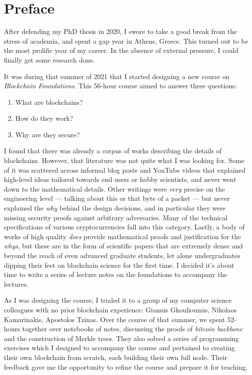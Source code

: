 \chapter*{Preface}

After defending my PhD thesis in 2020, I swore to take a good break
from the stress of academia, and spent a gap year in Athens, Greece.
This turned out to be the most prolific year of my career. In the absence
of external pressure, I could finally get some research done.

It was during that summer of 2021 that I started designing a new course on
\emph{Blockchain Foundations}. This 56-hour course aimed to answer
three questions:

\begin{enumerate}
  \item What are blockchains?
  \item How do they work?
  \item Why are they secure?
\end{enumerate}

I found that there was already a corpus of works describing the
details of blockchains. However, that literature was not quite what
I was looking for. Some of it was scattered across informal blog posts
and YouTube videos
that explained high-level ideas tailored towards end users or
hobby scientists, and never went down to the mathematical details.
Other writings were \emph{very} precise on the engineering level
--- talking about this or that byte of a packet --- but never explained
the \emph{why} behind the design decisions, and in particular they
were missing security proofs against arbitrary adversaries.
Many of the technical specifications of various cryptocurrencies
fall into this category.
Lastly, a body of works of high quality \emph{does} provide mathematical
proofs and justification
for the \emph{whys}, but these are in the form of scientific papers
that are extremely dense and beyond the reach of even advanced graduate
students, let alone undergraduates dipping their feet on blockchain
science for the first time. I decided it's about time to write a
series of lecture notes on the foundations to accompany the lectures.

As I was designing the course, I trialed it to a group of my computer
science colleagues with no prior blockchain experience:
Giannis Gkoulioumis, Nikolaos Kamarinakis, Apostolos Tzinas.
Over the course of that summer, we spent 52-hours together over notebooks
of notes, discussing the proofs of \emph{bitcoin backbone} and the
construction of Merkle trees. They also solved a series of programming
exercises which I designed to accompany the course and pertained to
creating their own blockchain from scratch, each building their own
full node. Their feedback gave me the opportunity to refine the course
and prepare it for teaching.

